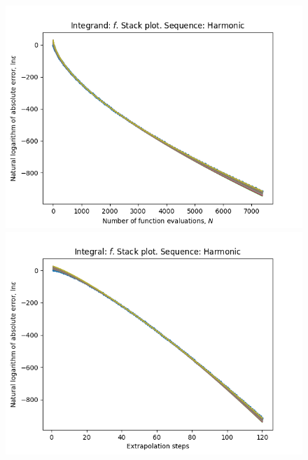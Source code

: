 \begin{figure}[H]
\centering
\begin{minipage}{0.45\textwidth}
\centering
\includegraphics[scale=0.45]{../results/romberg_plots/cos_squared_hp_harmonic_stack.png}
\end{minipage}
\begin{minipage}{0.45\textwidth}
\centering
\includegraphics[scale=0.45]{../results/romberg_plots/cos_squared_hp_harmonic_steps_stack.png}
\end{minipage}
\end{figure}


